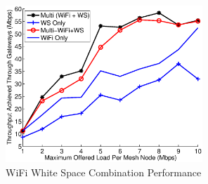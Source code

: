 \begin{figure}
\centering
\includegraphics[width=74mm]{figures/wifiws}
\vspace{-0.1in}
\caption{WiFi White Space Combination Performance}                                                                               
\label{fig:wifiws}
\end{figure}

